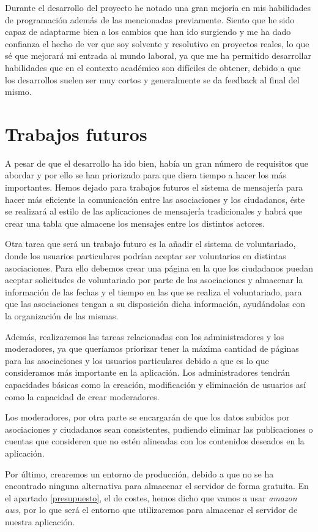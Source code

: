   Durante el desarrollo del proyecto he notado una gran mejoría en mis habilidades de programación además de las mencionadas previamente. Siento que he sido capaz de adaptarme bien a los cambios que han ido surgiendo y me ha dado confianza el hecho de ver que soy solvente y resolutivo en proyectos reales, lo que sé que mejorará mi entrada al mundo laboral, ya que me ha permitido desarrollar habilidades que en el contexto académico son difíciles de obtener, debido a que los desarrollos suelen ser muy cortos y generalmente se da feedback al final del mismo.


	
\section{Trabajos futuros}

A pesar de que el desarrollo ha ido bien, había un gran número de requisitos que abordar y por ello se han priorizado para que diera tiempo a hacer los más importantes. Hemos dejado para trabajos futuros el sistema de mensajería para hacer más eficiente la comunicación entre las asociaciones y los ciudadanos, éste se realizará al estilo de las aplicaciones de mensajería tradicionales y habrá que crear una tabla que almacene los mensajes entre los distintos actores.

Otra tarea que será un trabajo futuro es la añadir el sistema de voluntariado, donde los usuarios particulares podrían aceptar ser voluntarios en distintas asociaciones. Para ello debemos crear una página en la que los ciudadanos puedan aceptar solicitudes de voluntariado por parte de las asociaciones y almacenar la información de las fechas y el tiempo en las que se realiza el voluntariado, para que las asociaciones tengan a su disposición dicha información, ayudándolas con la organización de las mismas. 

Además, realizaremos las tareas relacionadas con los administradores y los moderadores, ya que queríamos priorizar tener la máxima cantidad de páginas para las asociaciones y los usuarios particulares debido a que es lo que consideramos más importante en la aplicación. Los administradores tendrán capacidades básicas como la creación, modificación y eliminación de usuarios así como la capacidad de crear moderadores. 

Los moderadores, por otra parte se encargarán de que los datos subidos por asociaciones y ciudadanos sean consistentes, pudiendo eliminar las publicaciones o cuentas que consideren que no estén alineadas con los contenidos deseados en la aplicación.

Por último, crearemos un entorno de producción, debido a que no se ha encontrado ninguna alternativa para almacenar el servidor de forma gratuita. En el apartado \ref{presupuesto}, el de costes, hemos dicho que vamos a usar \textit{amazon aws}, por lo que será el entorno que utilizaremos para almacenar el servidor de nuestra aplicación.



